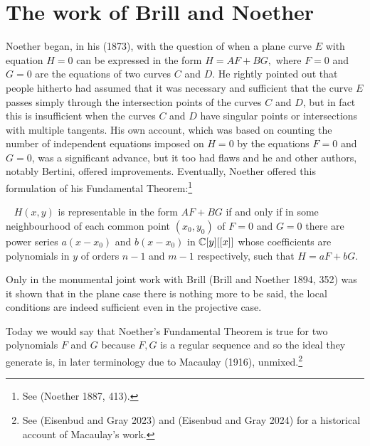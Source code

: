 \section{The work of Brill and Noether}
Noether began, in his (1873), with the question of when  a plane curve $E$ with equation $H=0$ can be expressed in the form $H = AF+BG,$ where $F=0$ and $G=0$ are the equations of two curves $C$ and $D.$ He rightly pointed out that people hitherto had assumed that it was necessary and sufficient that the curve $E$  passes simply through the intersection points of the curves $C$ and $D$, but in fact this is insufficient when the curves $C$ and $D$ have singular points or intersections with multiple tangents. His own account, which was based on counting the number of independent equations imposed on $H=0$ by the equations $F=0$ and $G=0$, was a significant advance, but it too had flaws and he and other authors, notably Bertini, offered improvements. Eventually, Noether  offered this formulation of his  Fundamental Theorem\label{Noether'sFT}:\footnote{See (Noether 1887, 413).}
\begin{theorem}~\label{NFT1887}
$H(x, y)$ is representable in the form $AF + BG$ if and only if in some neighbourhood of each common point $(x_0, y_0)$ of $F=0$ and $G=0$ there are power series $a(x-x_0)$ and $b(x-x_0)$ in $\CC[y][[x]]$ whose coefficients are polynomials in $y$ of orders  $n-1$ and $m-1$ respectively, such that $H = aF + bG.$ 
\end{theorem}
Only in the monumental joint work with Brill (Brill and Noether 1894, 352) was it shown that in the plane case there is nothing more to be said, the local conditions are indeed sufficient even in the projective case.


Today we would say that Noether's Fundamental Theorem is true for two polynomials $F$ and $G$ because $F,G$ is a regular sequence  and so  the ideal they generate is, in later terminology due to Macaulay (1916), unmixed.\footnote{See (Eisenbud and Gray 2023) and (Eisenbud and Gray 2024) for a historical account of Macaulay's work.}


